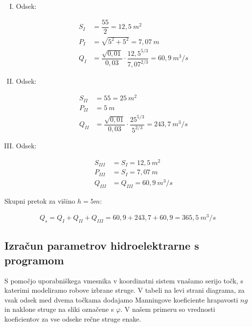\begin{enumerate}[I.]
	
	\item Odsek:
	
	\begin{ceqn}
		\begin{align}
			S_I&=\dfrac{5  5}{2} = 12,5~m^2\\
			P_I&=\sqrt{5^2 + 5^2} = 7,07~m\\
			Q_I&=\dfrac{\sqrt{0,01}}{0,03} \cdot \dfrac{12,5^{5/3}}{7,07^{2/3}} = 60,9~m^3/s
		\end{align}
	\end{ceqn}
		
	\item Odsek:
	
	\begin{ceqn}
		\begin{align}
			S_{II}&=55 = 25 ~m^2\\
			P_{II}&=5~m\\
			Q_{II}&=\dfrac{\sqrt{0,01}}{0,03} \cdot \dfrac{25^{5/3}}{5^{2/3}} = 243,7~m^3/s
		\end{align}
	\end{ceqn}
	
	\item Odsek:
	\begin{ceqn}
		\begin{align}
		S_{III}&=S_{I} = 12,5~m^2\\
		P_{III}&=S_{I} = 7,07~m\\
		Q_{III}&=Q_{III} = 60,9~m^3/s
		\end{align}
	\end{ceqn}
	
\end{enumerate}

Skupni pretok za višino $h=5m$:

\begin{ceqn}
 \begin{align}
Q_{s} = Q_{I} + Q_{II} + Q_{III} = 60,9 + 243,7 + 60,9 = 365,5~m^3/s
 \end{align}
 \end{ceqn}




\subsection{Izračun parametrov hidroelektrarne s programom}

S pomočjo uporabniškega vmesnika v koordinatni sistem vnašamo serijo točk, s katerimi modeliramo robove izbrane struge. V tabeli na levi strani diagrama, za vsak odsek med dvema točkama dodajamo Manningove koeficiente hrapavosti $ng$ in naklone struge na sliki označene s $\varphi$. V našem primeru so vrednosti koeficientov za vse odseke rečne struge enake.

